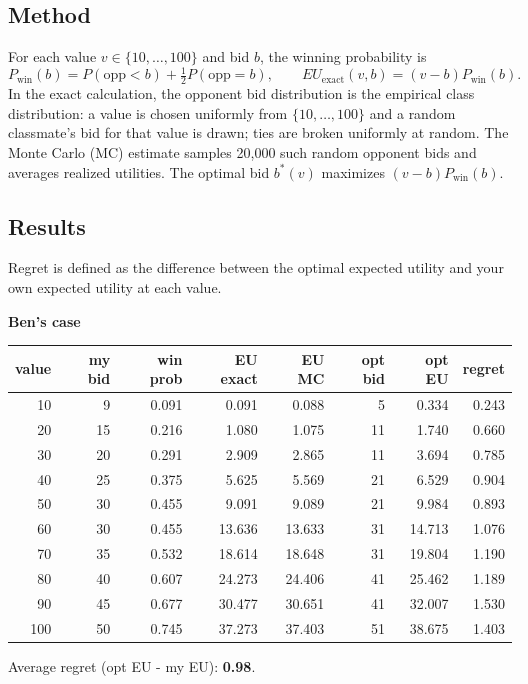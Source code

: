 \documentclass[11pt]{article}
\renewenvironment{shaded}{%
  \def\FrameCommand{\fboxsep=\FrameSep \colorbox{shadecolor}}%
  \MakeFramed{\advance\hsize-\width \FrameRestore\FrameRestore}}%
 {\endMakeFramed}
\begin{document}
\begin{shaded}
\subsection*{Method}
For each value $v\!\in\!\{10,\dots,100\}$ and bid $b$, the winning probability is
\[
P_{\text{win}}(b)=P(\text{opp}<b)+\tfrac12P(\text{opp}=b),
\qquad
EU_{\text{exact}}(v,b)=(v-b)P_{\text{win}}(b).
\]
In the exact calculation, the opponent bid distribution is the empirical class distribution:
a value is chosen uniformly from $\{10,\dots,100\}$ and a random classmate’s bid for that value is drawn; ties are broken uniformly at random.
The Monte Carlo (MC) estimate samples 20,000 such random opponent bids and averages realized utilities.
The optimal bid $b^*(v)$ maximizes $(v-b)P_{\text{win}}(b)$.

\subsection*{Results}
Regret is defined as the difference between the optimal expected utility and your own expected utility at each value.

\vspace{1em}
\textbf{Ben's case}
\begin{center}
\small
\begin{tabular}{@{}rrrrrrrr@{}}
\toprule
value & my bid & win prob & EU exact & EU MC & opt bid & opt EU & regret \\
\midrule
 10 &   9 & 0.091 & 0.091 & 0.088 &  5 & 0.334 & 0.243 \\
 20 &  15 & 0.216 & 1.080 & 1.075 & 11 & 1.740 & 0.660 \\
 30 &  20 & 0.291 & 2.909 & 2.865 & 11 & 3.694 & 0.785 \\
 40 &  25 & 0.375 & 5.625 & 5.569 & 21 & 6.529 & 0.904 \\
 50 &  30 & 0.455 & 9.091 & 9.089 & 21 & 9.984 & 0.893 \\
 60 &  30 & 0.455 &13.636 &13.633 & 31 &14.713 & 1.076 \\
 70 &  35 & 0.532 &18.614 &18.648 & 31 &19.804 & 1.190 \\
 80 &  40 & 0.607 &24.273 &24.406 & 41 &25.462 & 1.189 \\
 90 &  45 & 0.677 &30.477 &30.651 & 41 &32.007 & 1.530 \\
100 &  50 & 0.745 &37.273 &37.403 & 51 &38.675 & 1.403 \\
\bottomrule
\end{tabular}
\end{center}
Average regret (opt EU - my EU): \textbf{0.98}.


\end{shaded}
\end{document}
